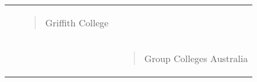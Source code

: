 \documentclass[]{book}
\begin{document}
\begin{longtable}[]{@{}lll@{}}
\begin{minipage}[t]{0.32\columnwidth}
\end{minipage} & \begin{minipage}[t]{0.32\columnwidth}\raggedright
\begin{quote}
Griffith College
\end{quote}\strut
\end{minipage}\tabularnewline
\begin{minipage}[t]{0.32\columnwidth}\raggedright
\strut
\end{minipage} & \begin{minipage}[t]{0.32\columnwidth}\raggedright
\strut
\end{minipage} & \begin{minipage}[t]{0.32\columnwidth}\raggedright
\begin{quote}
Group Colleges Australia
\end{quote}\strut
\end{minipage}\tabularnewline
\bottomrule
\end{longtable}
\end{document}
